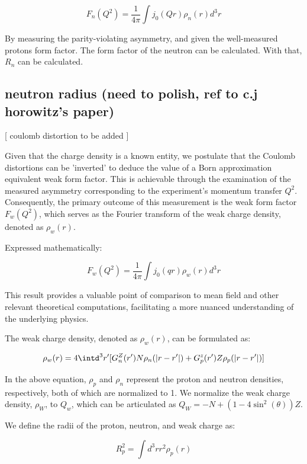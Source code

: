 \begin{equation}
    F_n(Q^2) = \frac{1}{4\pi}\int j_0(Qr)\rho_n(r)d^3r
\end{equation}


By measuring the parity-violating asymmetry, and given the well-measured protons form factor. The form factor of the neutron can be calculated. With that, $R_n$ can be calculated. 

\subsection{neutron radius (need to polish, ref to c.j horowitz's paper)}

[ coulomb distortion to be added ]

Given that the charge density is a known entity, we postulate that the Coulomb distortions can be 'inverted' to deduce the value of a Born approximation equivalent weak form factor. This is achievable through the examination of the measured asymmetry corresponding to the experiment's momentum transfer $Q^2$. Consequently, the primary outcome of this measurement is the weak form factor $F_w(Q^2)$, which serves as the Fourier transform of the weak charge density, denoted as $\rho_w(r)$.

Expressed mathematically:

\begin{equation}
F_w(Q^2) = \frac{1}{4\pi}\int j_0(qr)\rho_w(r)d^3r
\end{equation}

This result provides a valuable point of comparison to mean field and other relevant theoretical computations, facilitating a more nuanced understanding of the underlying physics.

The weak charge density, denoted as $\rho_w(r)$, can be formulated as:

\begin{equation}\label{eq:weak_charge_density_ch2_1}
\rho_w(r) = 4\intd^3r'[G_n^Z(r')N\rho_n(|r-r'|) + G^z_p(r')Z\rho_p(|r-r'|)]
\end{equation}

In the above equation, $\rho_p$ and $\rho_n$ represent the proton and neutron densities, respectively, both of which are normalized to 1. We normalize the weak charge density, $\rho_W$, to $Q_w$, which can be articulated as $Q_W = -N + (1-4\sin^2(\theta))Z$.

We define the radii of the proton, neutron, and weak charge as:

\begin{equation}
R^2_p = \int d^3rr^2\rho_p(r)
\end{equation}

